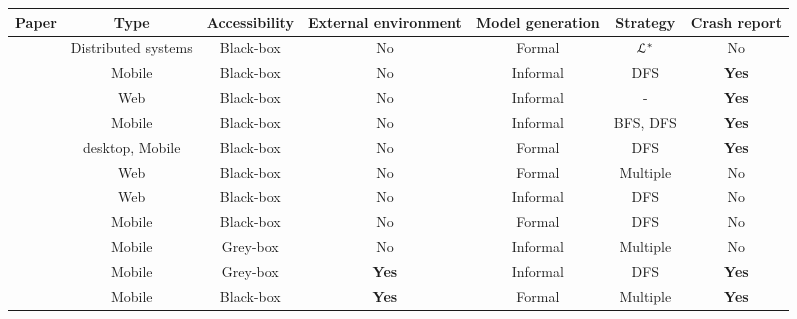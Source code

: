 \begin{table}
    \begin{center}
	\begin{tabular}{| c | c | c | c | c | c | c |}

		\hline

        Paper & Type & Accessibility & External environment & Model
        generation & Strategy & Crash report \\
		\hline


        \cite{hungar2002} & Distributed systems & Black-box & No &
        Formal & $\EuScript{L}^*$ & No
        \\
        \cite{Joorabchi:2012:REI:2420240.2420457} & Mobile &
        Black-box & No & Informal & DFS & \textbf{Yes}
        \\
		\cite{webmate12} & Web & Black-box & No & Informal & - & \textbf{Yes}
        \\
        \cite{5954416,Amalfitano:2012:UGR:2351676.2351717} &
        Mobile & Black-box  & No & Informal  & BFS, DFS & \textbf{Yes}
        \\
		\cite{guitar,MobiGUITARIEEESoftware2014} & desktop,
		Mobile & Black-box & No & Formal & DFS & \textbf{Yes}
        \\
        \cite{crawljax:tweb12} & Web & Black-box & No & Formal &
        Multiple & No
        \\
        \cite{4656395} & Web & Black-box & No & Informal & DFS & No
        \\
        \cite{Choi2013} & Mobile & Black-box & No & Formal & DFS &
        No
        \\
		\cite{WPX13} & Mobile & Grey-box & No & Informal & Multiple
		& No
        \\
        \cite{Azim13} & Mobile & Grey-box & \textbf{Yes} & Informal & DFS
        & \textbf{Yes}
        \\
        \cite{SP15} & Mobile & Black-box & \textbf{Yes} & Formal &
        Multiple & \textbf{Yes}
        \\
		\hline
	\end{tabular}
\end{center}


\end{table}
